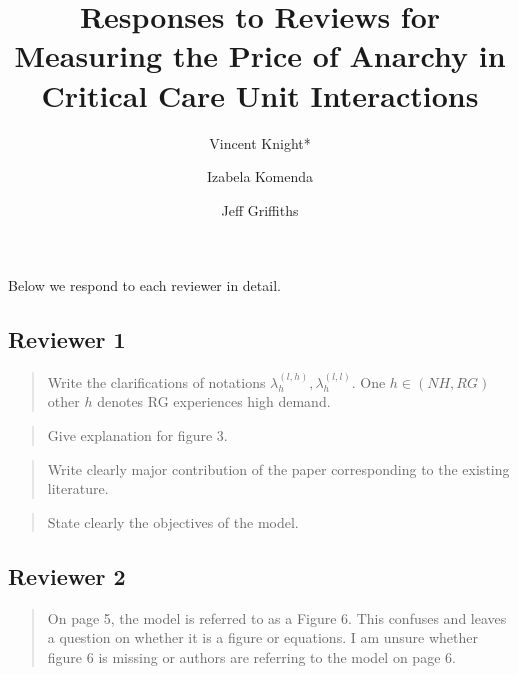 \documentclass{article}
\title{Responses to Reviews for Measuring the Price of Anarchy in Critical Care Unit Interactions}
\author{Vincent Knight*
    \and
        Izabela Komenda
    \and
        Jeff Griffiths}
\begin{document}
\maketitle

Below we respond to each reviewer in detail.

\subsection{Reviewer 1}

\begin{quote}
    \begin{textit}{
Write the clarifications of notations \(\lambda_{h}^{(l,h)},\lambda_{h}^{(l,l)}\). One \(h \in (NH,RG)\) other \(h\) denotes RG experiences high demand.
    }\end{textit}
\end{quote}

\begin{quote}
    \begin{textit}{
Give explanation for figure 3.
    }\end{textit}
\end{quote}

\begin{quote}
    \begin{textit}{
Write clearly major contribution of the paper corresponding to the existing
literature.
    }\end{textit}
\end{quote}

\begin{quote}
    \begin{textit}{
State clearly the objectives of the model.
    }\end{textit}
\end{quote}

\subsection{Reviewer 2}

\begin{quote}
    \begin{textit}{
    On page 5, the model is referred to as a Figure 6. This confuses and leaves a question on whether it is a figure or equations. I am unsure whether figure 6 is missing or authors are referring to the model on page 6.
    }\end{textit}
\end{quote}
\end{document}
